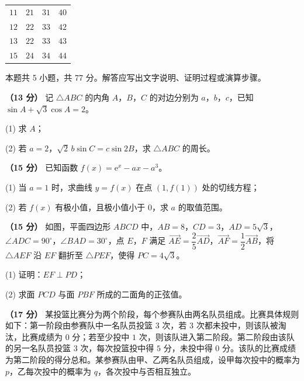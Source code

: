 \begin{center}
\begin{tabular}{cccc}
\toprule
 &  &  &  \\
\midrule
$11$ & $21$ & $31$ & $40$ \\
$12$ & $22$ & $33$ & $42$ \\
$13$ & $22$ & $33$ & $43$ \\
$15$ & $24$ & $34$ & $44$ \\
\bottomrule
\end{tabular}
\end{center}

\par\medskip


\begin{gktip}
本题共 5 小题，共 77 分。解答应写出文字说明、证明过程或演算步骤。
\end{gktip}

\textbf{（13 分）} 记 $\triangle ABC$ 的内角 $A$，$B$，$C$ 的对边分别为 $a$，$b$，$c$，已知 $\sin A+\sqrt3\cos A=2$。

  (1) 求 $A$；

  (2) 若 $a=2$，$\sqrt2\,b\sin C=c\sin2B$，求 $\triangle ABC$ 的周长。

\textbf{（15 分）} 已知函数 $f(x)=\mathrm e^{x}-ax-a^{3}$。

  (1) 当 $a=1$ 时，求曲线 $y=f(x)$ 在点 $\left(1,f(1)\right)$ 处的切线方程；

  (2) 若 $f(x)$ 有极小值，且极小值小于 $0$，求 $a$ 的取值范围。

\textbf{（15 分）} 如图，平面四边形 $ABCD$ 中，$AB=8$，$CD=3$，$AD=5\sqrt3$，$\angle ADC=90^{\circ}$，$\angle BAD=30^{\circ}$，点 $E$，$F$ 满足 $\overrightarrow{AE}=\dfrac25\overrightarrow{AD}$，$\overrightarrow{AF}=\dfrac12\overrightarrow{AB}$，将 $\triangle AEF$ 沿 $EF$ 翻折至 $\triangle PEF$，使得 $PC=4\sqrt3$。

\begin{center}\end{center}

  (1) 证明：$EF\perp PD$；

  (2) 求面 $PCD$ 与面 $PBF$ 所成的二面角的正弦值。

\textbf{（17 分）} 某投篮比赛分为两个阶段，每个参赛队由两名队员组成。比赛具体规则如下：第一阶段由参赛队中一名队员投篮 $3$ 次，若 $3$ 次都未投中，则该队被淘汰，比赛成绩为 $0$ 分；若至少投中 $1$ 次，则该队进入第二阶段。第二阶段由该队的另一名队员投篮 $3$ 次，每次投篮投中得 $5$ 分，未投中得 $0$ 分。该队的比赛成绩为第二阶段的得分总和。某参赛队由甲、乙两名队员组成，设甲每次投中的概率为 $p$，乙每次投中的概率为 $q$，各次投中与否相互独立。

